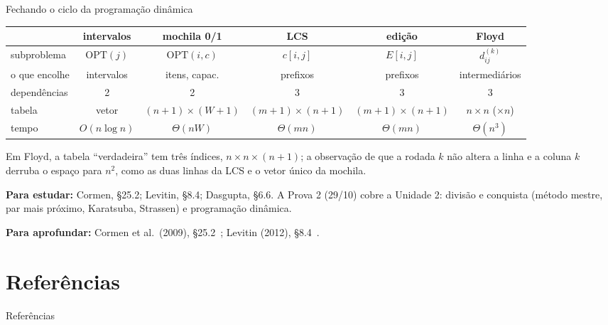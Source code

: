 \documentclass[aspectratio=169,xcolor=table]{beamer}
\newcommand{\fonte}[1]{%
  \vfill
  {\tiny\color{gray!55!black}\textbf{Para aprofundar:} #1\par}%
}
\begin{document}
\begin{frame}{Fechando o ciclo da programação dinâmica}
  \begin{center}
  \scriptsize
  \begin{tabular}{lccccc}
    \toprule
    & intervalos & mochila 0/1 & LCS & edição & Floyd \\
    \midrule
    subproblema & $\mathrm{OPT}(j)$ & $\mathrm{OPT}(i,c)$ & $c[i,j]$ & $E[i,j]$ & $d^{(k)}_{ij}$ \\
    o que encolhe & intervalos & itens, capac. & prefixos & prefixos & intermediários \\
    dependências & 2 & 2 & 3 & 3 & 3 \\
    tabela & vetor & $(n{+}1)\times(W{+}1)$ & $(m{+}1)\times(n{+}1)$ & $(m{+}1)\times(n{+}1)$
      & $n\times n$ ($\times n$) \\
    tempo & $O(n\log n)$ & $\Theta(nW)$ & $\Theta(mn)$ & $\Theta(mn)$ & $\Theta(n^3)$ \\
    \bottomrule
  \end{tabular}
  \end{center}
  \medskip
  {\scriptsize
  Em Floyd, a tabela ``verdadeira'' tem três índices, $n \times n \times (n+1)$; a observação
  de que a rodada $k$ não altera a linha e a coluna $k$ derruba o espaço para $n^2$, como as
  duas linhas da LCS e o vetor único da mochila.
  \smallskip

  \textbf{Para estudar:} Cormen, \S 25.2; Levitin, \S 8.4; Dasgupta, \S 6.6. A Prova 2 (29/10)
  cobre a Unidade 2: divisão e conquista (método mestre, par mais próximo, Karatsuba,
  Strassen) e programação dinâmica.}
  \fonte{Cormen et al.\ (2009), \S 25.2~\cite{cormen2009introduction};
    Levitin (2012), \S 8.4~\cite{levitin2012introduction}.}
\end{frame}

\section*{Referências}
\begin{frame}[allowframebreaks]{Referências}
  \tiny
  \nocite{cormen2009introduction,cormen2012algoritmos,levitin2012introduction,dasgupta2008algorithms,warshall1962theorem,floyd1962algorithm,roy1959transitivite,johnson1977efficient,feofiloff2020grafos}
  
  
\end{frame}
\end{document}
